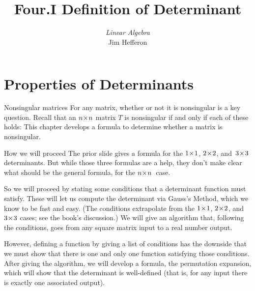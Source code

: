 \documentclass[9pt,t]{beamer}
\title[Determinants] %
{Four.I Definition of Determinant}
\author{\textit{Linear Algebra} \\ {\small Jim Hef{}feron}}
\institute{
  \texttt{http://joshua.smcvt.edu/linearalgebra}
}
\date{}
\begin{document}
\begin{frame}
  \titlepage
\end{frame}




\section{Properties of Determinants}
\begin{frame}{Nonsingular matrices}
\noindent For any matrix, whether or not it is nonsingular is a key question.
Recall that an \( n \! \times \! n \) matrix \( T \) is nonsingular if and only if
each of these holds:%
This chapter develops a formula to determine whether a
matrix is nonsingular.
\end{frame}




\begin{frame}
\end{frame}




\begin{frame}{How we will proceed}
The prior slide gives a formula for the $1 \! \times \! 1$, $2 \! \times \! 2$, and~$3 \! \times \! 3$
determinants. 
But while those three formulas are a help, they don't make clear what
should be the general formula, for the $n \! \times \! n$~case.

So we will proceed by stating some conditions that a
determinant function must satisfy. 
These will let us compute the determinant via Gauss's Method, 
which we know to be fast and easy.
(The conditions extrapolate from the $1 \! \times \! 1$, $2 \! \times \! 2$, 
and~$3 \! \times \! 3$ cases; see the book's discussion.) 
We will give an algorithm that, following the conditions, goes from 
any square matrix input to a real number output.

\pause
However, defining a function by giving a list of conditions 
has the downside that we must 
show that there is one and only one function satisfying those conditions.
After giving the algorithm, we will develop a formula, 
the permutation expansion,
which will show that the determinant is well-defined (that is, 
for any input there is exactly one associated output). 
\end{frame}
\end{document}

